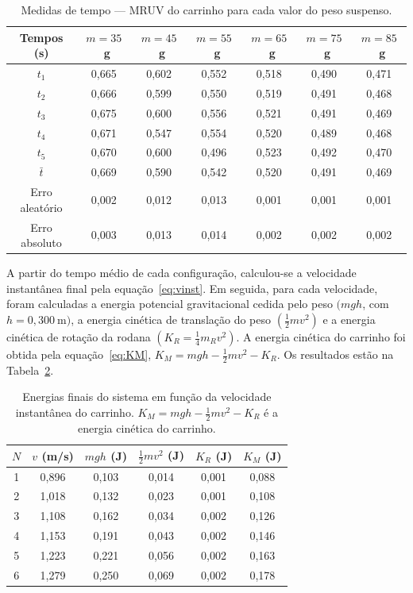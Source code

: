 \documentclass[12pt,a4paper]{article}
\begin{document}
\begin{table}[!h]
	\centering
	\begin{tabular}{|c|c|c|c|c|c|c|} \hline \hline
	Tempos (s) & $m=35$~g & $m=45$~g & $m=55$~g & $m=65$~g & $m=75$~g & $m=85$~g \\ \hline \hline
	$t_1$          & 0,665 & 0,602 & 0,552 & 0,518 & 0,490 & 0,471 \\ \hline
	$t_2$          & 0,666 & 0,599 & 0,550 & 0,519 & 0,491 & 0,468 \\ \hline
	$t_3$          & 0,675 & 0,600 & 0,556 & 0,521 & 0,491 & 0,469 \\ \hline
	$t_4$          & 0,671 & 0,547 & 0,554 & 0,520 & 0,489 & 0,468 \\ \hline
	$t_5$          & 0,670 & 0,600 & 0,496 & 0,523 & 0,492 & 0,470 \\ \hline
	$\bar{t}$      & 0,669 & 0,590 & 0,542 & 0,520 & 0,491 & 0,469 \\ \hline
	Erro aleatório & 0,002 & 0,012 & 0,013 & 0,001 & 0,001 & 0,001 \\ \hline
	Erro absoluto  & 0,003 & 0,013 & 0,014 & 0,002 & 0,002 & 0,002 \\ \hline \hline
	\end{tabular}
	\caption{Medidas de tempo --- MRUV do carrinho para cada valor do peso suspenso.}
	\label{tab:tempos}
\end{table}

A partir do tempo médio de cada configuração, calculou-se a velocidade instantânea final pela
equação~\eqref{eq:vinst}. Em seguida, para cada velocidade, foram calculadas a energia potencial
gravitacional cedida pelo peso $(mgh$, com $h = 0{,}300~\mathrm{m})$, a energia cinética de
translação do peso $(\tfrac{1}{2}mv^2)$ e a energia cinética de rotação da rodana
$(K_R = \tfrac{1}{4}m_R v^2)$. A energia cinética do carrinho foi obtida pela equação~\eqref{eq:KM},
$K_M = mgh - \tfrac{1}{2}mv^2 - K_R$. Os resultados estão na Tabela~\ref{tab:energias}.

\begin{table}[!h]
	\centering
	\begin{tabular}{|c|c|c|c|c|c|} \hline \hline
	$N$ & $v$ (m/s) & $mgh$ (J) & $\tfrac{1}{2}mv^2$ (J) & $K_R$ (J) & $K_M$ (J) \\ \hline \hline
	1 & 0,896 & 0,103 & 0,014 & 0,001 & 0,088 \\ \hline
	2 & 1,018 & 0,132 & 0,023 & 0,001 & 0,108 \\ \hline
	3 & 1,108 & 0,162 & 0,034 & 0,002 & 0,126 \\ \hline
	4 & 1,153 & 0,191 & 0,043 & 0,002 & 0,146 \\ \hline
	5 & 1,223 & 0,221 & 0,056 & 0,002 & 0,163 \\ \hline
	6 & 1,279 & 0,250 & 0,069 & 0,002 & 0,178 \\ \hline \hline
	\end{tabular}
	\caption{Energias finais do sistema em função da velocidade instantânea do carrinho.
	$K_M = mgh - \tfrac{1}{2}mv^2 - K_R$ é a energia cinética do carrinho.}
	\label{tab:energias}
\end{table}
\end{document}

